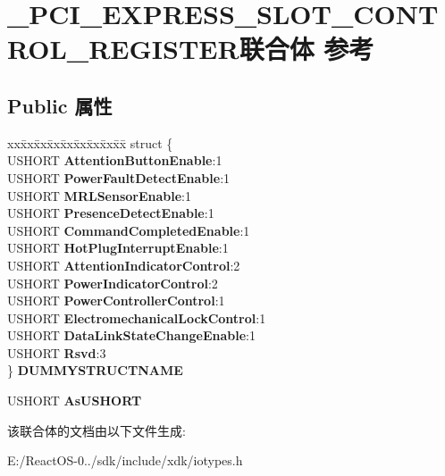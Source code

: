 \hypertarget{union___p_c_i___e_x_p_r_e_s_s___s_l_o_t___c_o_n_t_r_o_l___r_e_g_i_s_t_e_r}{}\section{\+\_\+\+P\+C\+I\+\_\+\+E\+X\+P\+R\+E\+S\+S\+\_\+\+S\+L\+O\+T\+\_\+\+C\+O\+N\+T\+R\+O\+L\+\_\+\+R\+E\+G\+I\+S\+T\+E\+R联合体 参考}
\label{union___p_c_i___e_x_p_r_e_s_s___s_l_o_t___c_o_n_t_r_o_l___r_e_g_i_s_t_e_r}
\subsection*{Public 属性}
\begin{DoxyCompactItemize}
\item 
\mbox{\label{union___p_c_i___e_x_p_r_e_s_s___s_l_o_t___c_o_n_t_r_o_l___r_e_g_i_s_t_e_r_aa3980652451298c095f53bf1ca6ed93c}} 
\begin{tabbing}
xx\=xx\=xx\=xx\=xx\=xx\=xx\=xx\=xx\=\kill
struct \{\\
\>USHORT {\bfseries AttentionButtonEnable}:1\\
\>USHORT {\bfseries PowerFaultDetectEnable}:1\\
\>USHORT {\bfseries MRLSensorEnable}:1\\
\>USHORT {\bfseries PresenceDetectEnable}:1\\
\>USHORT {\bfseries CommandCompletedEnable}:1\\
\>USHORT {\bfseries HotPlugInterruptEnable}:1\\
\>USHORT {\bfseries AttentionIndicatorControl}:2\\
\>USHORT {\bfseries PowerIndicatorControl}:2\\
\>USHORT {\bfseries PowerControllerControl}:1\\
\>USHORT {\bfseries ElectromechanicalLockControl}:1\\
\>USHORT {\bfseries DataLinkStateChangeEnable}:1\\
\>USHORT {\bfseries Rsvd}:3\\
\} {\bfseries DUMMYSTRUCTNAME}\\

\end{tabbing}\item 
\mbox{\label{union___p_c_i___e_x_p_r_e_s_s___s_l_o_t___c_o_n_t_r_o_l___r_e_g_i_s_t_e_r_a5a46a8b7b3253272641f6edadddfecc1}} 
U\+S\+H\+O\+RT {\bfseries As\+U\+S\+H\+O\+RT}
\end{DoxyCompactItemize}


该联合体的文档由以下文件生成\+:\begin{DoxyCompactItemize}
\item 
E\+:/\+React\+O\+S-\/0../sdk/include/xdk/iotypes.\+h\end{DoxyCompactItemize}
